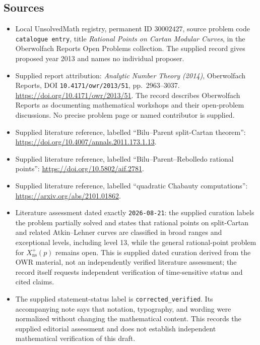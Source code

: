 \documentclass[11pt]{article}
\begin{document}
\subsection{Sources}
\begin{itemize}
\item Local UnsolvedMath registry, permanent ID \(30002427\), source problem code \texttt{catalogue entry}, title \emph{Rational Points on Cartan Modular Curves}, in the Oberwolfach Reports Open Problems collection. The supplied record gives proposed year 2013 and names no individual proposer.
\item Supplied report attribution: \emph{Analytic Number Theory (2014)}, Oberwolfach Reports, DOI \texttt{10.4171/owr/2013/51}, pp.\ 2963--3037. \url{https://doi.org/10.4171/owr/2013/51}. The record describes Oberwolfach Reports as documenting mathematical workshops and their open-problem discussions. No precise problem page or named contributor is supplied.
\item Supplied literature reference, labelled ``Bilu--Parent split-Cartan theorem'': \url{https://doi.org/10.4007/annals.2011.173.1.13}.
\item Supplied literature reference, labelled ``Bilu--Parent--Rebolledo rational points'': \url{https://doi.org/10.5802/aif.2781}.
\item Supplied literature reference, labelled ``quadratic Chabauty computations'': \url{https://arxiv.org/abs/2101.01862}.
\item Literature assessment dated exactly \texttt{2026-08-21}: the supplied curation labels the problem partially solved and states that rational points on split-Cartan and related Atkin--Lehner curves are classified in broad ranges and exceptional levels, including level 13, while the general rational-point problem for \(X_{\mathrm{ns}}^+(p)\) remains open. This is supplied dated curation derived from the OWR material, not an independently verified literature assessment; the record itself requests independent verification of time-sensitive status and cited claims.
\item The supplied statement-status label is \texttt{corrected\_verified}. Its accompanying note says that notation, typography, and wording were normalized without changing the mathematical content. This records the supplied editorial assessment and does not establish independent mathematical verification of this draft.
\end{itemize}
\end{document}
